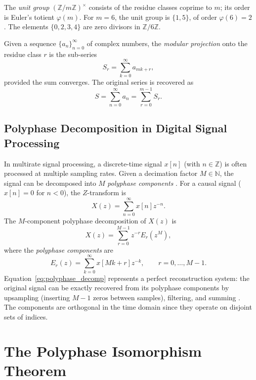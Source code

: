 \documentclass{mcom-l} %
\theoremstyle{plain} %
\theoremstyle{definition} %
\theoremstyle{remark} %
\begin{document}
The \emph{unit group} \((\mathbb{Z}/m\mathbb{Z})^{\times}\) consists of the residue classes coprime to \(m\); its order is Euler's totient \(\varphi(m)\). For \(m=6\), the unit group is \(\{1,5\}\), of order \(\varphi(6)=2\). The elements \(\{0,2,3,4\}\) are zero divisors in \(\mathbb{Z}/6\mathbb{Z}\).

Given a sequence \(\{a_n\}_{n=0}^{\infty}\) of complex numbers, the \emph{modular projection} onto the residue class \(r\) is the sub-series
\begin{equation}
S_r = \sum_{k=0}^{\infty} a_{mk + r},
\label{eq:Sr}
\end{equation}
provided the sum converges. The original series is recovered as
\begin{equation}
S = \sum_{n=0}^{\infty} a_n = \sum_{r=0}^{m-1} S_r.
\label{eq:recovery}
\end{equation}

\subsection{Polyphase Decomposition in Digital Signal Processing}
In multirate signal processing, a discrete-time signal \(x[n]\) (with \(n \in \mathbb{Z}\)) is often processed at multiple sampling rates. Given a decimation factor \(M \in \mathbb{N}\), the signal can be decomposed into \(M\) \emph{polyphase components} \cite{vaidyanathan}. For a causal signal (\(x[n] = 0\) for \(n < 0\)), the \(Z\)-transform is
\begin{equation}
X(z) = \sum_{n=0}^{\infty} x[n] z^{-n}.
\label{eq:ZT}
\end{equation}
The \(M\)-component polyphase decomposition of \(X(z)\) is
\begin{equation}
X(z) = \sum_{r=0}^{M-1} z^{-r} E_r(z^M),
\label{eq:polyphase_decomp}
\end{equation}
where the \emph{polyphase components} are
\begin{equation}
E_r(z) = \sum_{k=0}^{\infty} x[Mk + r] z^{-k}, \qquad r = 0, \dots, M-1.
\label{eq:Er}
\end{equation}
Equation~\eqref{eq:polyphase_decomp} represents a perfect reconstruction system: the original signal can be exactly recovered from its polyphase components by upsampling (inserting \(M-1\) zeros between samples), filtering, and summing \cite{vaidyanathan}. The components are orthogonal in the time domain since they operate on disjoint sets of indices.

\section{The Polyphase Isomorphism Theorem}
\label{sec:isomorphism}
\end{document}
